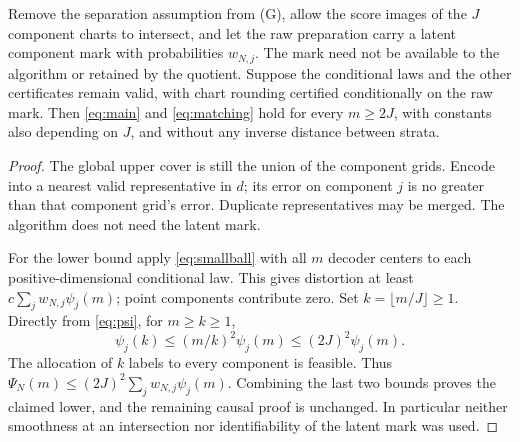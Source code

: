 \begin{corollary}\label{cor:crossing}
Remove the separation assumption from \textup{(G)}, allow the score images of the $J$ component charts to intersect, and let the raw preparation carry a latent component mark with probabilities $w_{N,j}$. The mark need not be available to the algorithm or retained by the quotient. Suppose the conditional laws and the other certificates remain valid, with chart rounding certified conditionally on the raw mark. Then \eqref{eq:main} and \eqref{eq:matching} hold for every $m\ge2J$, with constants also depending on $J$, and without any inverse distance between strata.
\end{corollary}
\begin{proof}
The global upper cover is still the union of the component grids. Encode into a nearest valid representative in $d$; its error on component $j$ is no greater than that component grid's error. Duplicate representatives may be merged. The algorithm does not need the latent mark.

For the lower bound apply \eqref{eq:smallball} with all $m$ decoder centers to each positive-dimensional conditional law. This gives distortion at least $c\sum_jw_{N,j}\psi_j(m)$; point components contribute zero. Set $k=\lfloor m/J\rfloor\ge1$. Directly from \eqref{eq:psi}, for $m\ge k\ge1$,
\[
 \psi_j(k)\le(m/k)^2\psi_j(m)\le(2J)^2\psi_j(m).
\]
The allocation of $k$ labels to every component is feasible. Thus $\Psi_N(m)\le(2J)^2\sum_jw_{N,j}\psi_j(m)$. Combining the last two bounds proves the claimed lower, and the remaining causal proof is unchanged. In particular neither smoothness at an intersection nor identifiability of the latent mark was used.
\end{proof}
